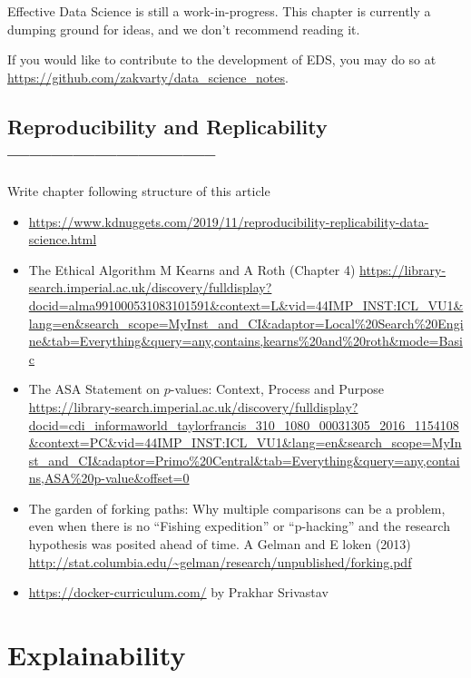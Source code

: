 \documentclass[
  12pt,
]{book}
\begin{document}
Effective Data Science is still a work-in-progress. This chapter is currently a dumping ground for ideas, and we don't recommend reading it.

If you would like to contribute to the development of EDS, you may do so at \url{https://github.com/zakvarty/data_science_notes}.

\hypertarget{reproducibility-and-replicability}{%
\section{Reproducibility and Replicability -----------------------------}\label{reproducibility-and-replicability}}

Write chapter following structure of this article

\begin{itemize}
\item
  \url{https://www.kdnuggets.com/2019/11/reproducibility-replicability-data-science.html}
\item
  The Ethical Algorithm M Kearns and A Roth (Chapter 4) \url{https://library-search.imperial.ac.uk/discovery/fulldisplay?docid=alma991000531083101591\&context=L\&vid=44IMP_INST:ICL_VU1\&lang=en\&search_scope=MyInst_and_CI\&adaptor=Local\%20Search\%20Engine\&tab=Everything\&query=any,contains,kearns\%20and\%20roth\&mode=Basic}
\item
  The ASA Statement on \(p\)-values: Context, Process and Purpose \url{https://library-search.imperial.ac.uk/discovery/fulldisplay?docid=cdi_informaworld_taylorfrancis_310_1080_00031305_2016_1154108\&context=PC\&vid=44IMP_INST:ICL_VU1\&lang=en\&search_scope=MyInst_and_CI\&adaptor=Primo\%20Central\&tab=Everything\&query=any,contains,ASA\%20p-value\&offset=0}
\item
  The garden of forking paths: Why multiple comparisons can be a problem,
  even when there is no ``Fishing expedition'' or ``p-hacking'' and the research
  hypothesis was posited ahead of time. A Gelman and E loken (2013) \url{http://stat.columbia.edu/~gelman/research/unpublished/forking.pdf}
\item
  \url{https://docker-curriculum.com/} by Prakhar Srivastav
\end{itemize}

\hypertarget{production-explainability}{%
\chapter{Explainability}\label{production-explainability}}
\end{document}
